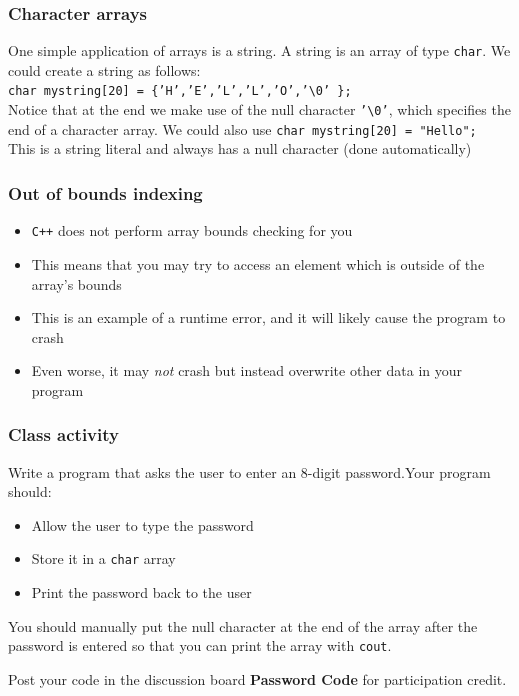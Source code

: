 \documentclass{if-beamer}
\begin{document}
\begin{frame}
\frametitle{Character arrays}
One simple application of arrays is a string. A string is an array of
type \texttt{char}. We could create a string as follows: \\
\vspace{5pt}
\texttt{char mystring[20] = \{'H','E','L','L','O','\textbackslash 0' \}; } \\
\vspace{5pt}
Notice that at the end we make use of the null character \texttt{'\textbackslash 0'}, which specifies the end of a character array. We could also use
\vspace{5pt}
\texttt{char mystring[20] = "Hello";} \\
\vspace{5pt}
This is a string literal and always has a null character (done automatically)
\end{frame}

\begin{frame}
\frametitle{Out of bounds indexing}
\begin{itemize}
\item<1-> \texttt{C++} does not perform array bounds checking for you
\item<2-> This means that you may try to access an element which is outside of the array's bounds
\item<3-> This is an example of a runtime error, and it will likely cause the program
to crash
\item<4-> Even worse, it may \textit{not} crash but instead
overwrite other data in your program
\end{itemize}
\end{frame}

\begin{frame}
\frametitle{Class activity}
Write a program that asks the user to enter an 8-digit password.Your program should:\\

\begin{itemize}
	\item Allow the user to type the password
	\item Store it in a \texttt{char} array
	\item Print the password back to the user
\end{itemize}
You should manually put the null character at the end of the array after the password is entered so that you can print the array with \texttt{cout}.

\vspace{10pt}
Post your code in the discussion board \textbf{Password Code} for participation credit. 
\end{frame}
\end{document}
